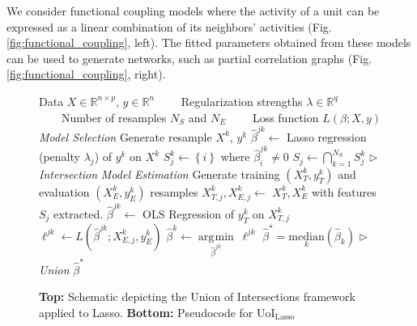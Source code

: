 \documentclass[letterpaper, 10 pt, conference]{ieeeconf}  %
\DeclareMathOperator*{\argmin}{\arg\!\min}
\begin{document}
We consider functional coupling models where the activity of a unit can be expressed as a linear combination of its neighbors' activities (Fig. \ref{fig:functional_coupling}, left). The fitted parameters obtained from these models can be used to generate networks, such as partial correlation graphs (Fig. \ref{fig:functional_coupling}, right).
\begin{figure}[t]
    \centering
    \vspace{-10pt}
    \begin{algorithmic}[1]
        \renewcommand{\algorithmicrequire}{\textbf{Input:}}
        \renewcommand{\algorithmicensure}{\textbf{Output:}}
        \REQUIRE Data $X \in \mathbb{R}^{n\times p}$, $y \in \mathbb{R}^{n}$
        \STATE \ \ \ \  Regularization strengths $\lambda \in \mathbb{R}^q$
        \STATE \ \ \ \  Number of resamples $N_S$ and $N_E$
        \STATE \ \ \ \  Loss function $L(\beta; X, y)$
        \STATE \textit{Model Selection}
            \STATE Generate resample $X^k$, $y^k$
                \STATE $\hat{\beta}^{jk}\leftarrow$ Lasso regression (penalty $\lambda_j$) of $y^k$ on $X^k$
                \STATE $S_j^k \leftarrow \left\{i\right\}$ where $\hat{\beta}^{jk}_i \neq 0$
            \ENDFOR
        \ENDFOR
            \STATE $\displaystyle S_j \leftarrow \bigcap_{k=1}^{N_S}S_j^k$ \hfill $\triangleright$ \textit{ Intersection}
        \ENDFOR
        \STATE \textit{Model Estimation}
            \STATE Generate training $\left(X_T^k, y_T^k\right)$ and evaluation $\left(X_E^k, y_E^k\right)$ resamples
                \STATE $X_{T, j}^k, X_{E, j}^k \leftarrow $ $X_T^k, X_E^k$ with features $S_j$ extracted. 
                \STATE $\hat{\beta}^{jk} \leftarrow$ OLS Regression of $y_T^k$ on $X_{T,j}^k$
                \STATE $\ell^{jk} \leftarrow L(\hat{\beta}^{jk}; X^k_{E, j}, y_E^k)$
            \ENDFOR
            \STATE $\hat{\beta}^k \leftarrow \underset{\hat{\beta}^{jk}}{\argmin} \ \ell^{jk}$
        \ENDFOR
        \STATE $\hat{\beta}^* = \underset{k}{\text{median}}\left(\hat{\beta}_k\right)$ \hfill $\triangleright$ \textit{ Union}
        \RETURN $\hat{\beta}^*$ 
    \end{algorithmic} 
    \vspace{-8pt}
    \caption{\textbf{Top:} Schematic depicting the Union of Intersections framework applied to Lasso. \textbf{Bottom:} Pseudocode for UoI$_{\text{Lasso}}$}
    \label{fig:uoi}
    \vspace{-15pt}
\end{figure}
\end{document}
